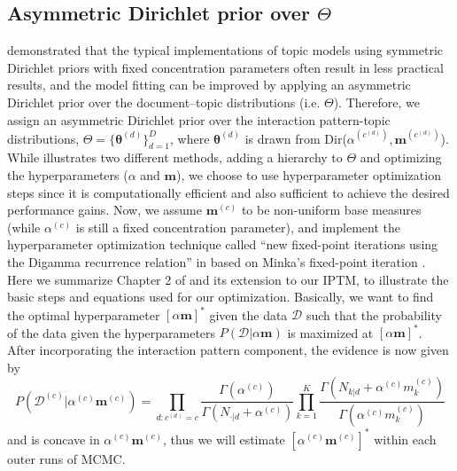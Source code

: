 \documentclass[a4paper]{article}
\begin{document}
 \subsection{Asymmetric Dirichlet prior over $\Theta$}  \label{subsec: Asymmetric Dirichlet prior over theta}
 \cite{wallach2009rethinking} demonstrated that the typical implementations of topic models using symmetric Dirichlet priors with fixed concentration parameters often result in less practical results, and the model fitting can be improved by applying an asymmetric Dirichlet prior over the document–topic distributions (i.e. $\Theta$). Therefore, we assign an asymmetric Dirichlet prior over the interaction pattern-topic distributions, $\Theta=\{\boldsymbol{\theta}^{(d)} \}_{d=1}^{D}$, where $\boldsymbol{\theta}^{(d)}$ is drawn from Dir($\alpha^{(c^{(d)})}, \boldsymbol{m}^{(c^{(d)})}$). While \cite{wallach2009rethinking} illustrates two different methods, adding a hierarchy to $\Theta$ and optimizing the hyperparameters ($\alpha$ and $\boldsymbol{m}$), we choose to use hyperparameter
 optimization steps since it is computationally efficient and also sufficient to achieve the desired performance gains. Now, we assume $\boldsymbol{m}^{(c)}$ to be non-uniform base measures (while $\alpha^{(c)}$ is still a fixed concentration parameter), and implement the hyperparameter optimization technique called ``new fixed-point iterations using the Digamma recurrence relation'' in \cite{wallach2008structured} based on Minka’s fixed-point iteration \citep{minka2000estimating}.\\ \newline
 Here we summarize Chapter 2 of \cite{wallach2008structured} and its extension to our IPTM, to illustrate the basic steps and equations used for our optimization. Basically, we want to find the optimal hyperparameter $[\alpha\boldsymbol{m}]^*$ given the data $\mathcal{D}$ such that the probability of the
 data given the hyperparameters $P(\mathcal{D}|\alpha\boldsymbol{m})$ is maximized at $[\alpha\boldsymbol{m}]^*$. After incorporating the interaction pattern component, the evidence is now given by 
 \begin{equation}
 P(\mathcal{D}^{(c)}|\alpha^{(c)}\boldsymbol{m}^{(c)})=\prod_{d:c^{(d)}=c} \frac{\Gamma(\alpha^{(c)})}{\Gamma(N_{\cdot|d}+\alpha^{(c)})}\prod_{k=1}^{K}\frac{\Gamma(N_{k|d}+\alpha^{(c)} m^{(c)}_k)}{\Gamma(\alpha^{(c)} m^{(c)}_k)}
 \end{equation} and is concave in $\alpha^{(c)} \boldsymbol{m}^{(c)}$, thus we will estimate $[\alpha^{(c)}\boldsymbol{m}^{(c)}]^*$ within each outer runs of MCMC.\\
\end{document}
